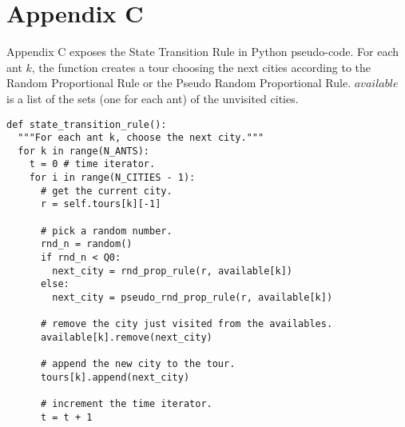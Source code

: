 \documentclass[a4paper,9pt,journal,twoside,compsoc]{PPIEEEtran}
\begin{document}
\section{Appendix C}
Appendix C exposes the State Transition Rule in Python pseudo-code. For each ant $k$, the function creates a tour choosing the next cities according to the Random Proportional Rule or the Pseudo Random Proportional Rule. $available$ is a list of the sets (one for each ant) of the unvisited cities.

\begin{lstlisting}[basicstyle=\scriptsize \ttfamily]
def state_transition_rule():
  """For each ant k, choose the next city."""
  for k in range(N_ANTS):     
    t = 0 # time iterator.
    for i in range(N_CITIES - 1):
      # get the current city.
      r = self.tours[k][-1]

      # pick a random number.
      rnd_n = random()
      if rnd_n < Q0:
        next_city = rnd_prop_rule(r, available[k])
      else:
        next_city = pseudo_rnd_prop_rule(r, available[k])
		
      # remove the city just visited from the availables.
      available[k].remove(next_city)  
        
      # append the new city to the tour.
      tours[k].append(next_city)
		
      # increment the time iterator.        
      t = t + 1

\end{lstlisting}

\end{document}
